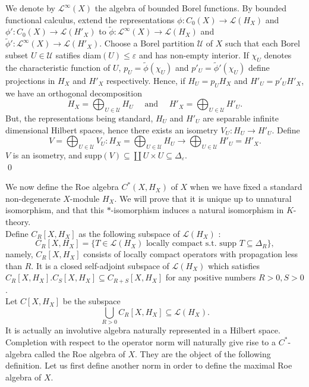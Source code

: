\begin{dem}
We denote by $\mathcal L^\infty(X)$ the algebra of bounded Borel functions. By bounded functional calculus, extend the representations $\phi : C_0(X)\rightarrow \mathcal L(H_X)$ and $\phi' : C_0(X)\rightarrow \mathcal L(H'_X)$ to $\tilde \phi : \mathcal L^\infty(X)\rightarrow \mathcal L(H_X) $ and $\tilde \phi' : \mathcal L^\infty(X)\rightarrow \mathcal L(H'_X) $. Choose a Borel partition $\mathcal U$ of $X$ such that each Borel subset $U\in\mathcal U$ satifies diam$(U)\leq \varepsilon $ and has non-empty interior. If $\chi_U$ denotes the characteristic function of $U$, $p_U = \tilde\phi(\chi_U)$ and $p'_{U}=\tilde\phi'(\chi_U)$ define projections in $H_X$ and $H'_X$ respectively. Hence, if $H_U = p_U H_X$ and $H'_U= p'_U H'_X$, we have an orthogonal decomposition 
\[H_X = \bigoplus_{U\in\mathcal U} H_U \quad  \text{ and } \quad H'_X = \bigoplus_{U\in\mathcal U} H'_U.\]
But, the representations being standard, $H_U$ and $H'_U$ are separable infinite dimensional Hilbert spaces, hence there exists an isometry $V_U : H_U\rightarrow H'_U$. Define 
\[V = \bigoplus_{U\in\mathcal U} V_U : H_X = \bigoplus_{U\in\mathcal U} H_U \rightarrow  \bigoplus_{U\in\mathcal U} H'_U = H'_X.  \]
$V$ is an isometry, and supp$(V)\subseteq \coprod U\times U \subseteq \Delta_\varepsilon$.\\
\qed
\end{dem}


We now define the Roe algebra $C^*(X, H_X)$ of $X$ when we have fixed a standard non-degenerate $X$-module $H_X$. We will prove that it is unique up to unnatural isomorphism, and that this $*$-isomorphism induces a natural isomorphism in $K$-theory.\\

Define $C_R[X,H_X]$ as the following subspace of $\mathcal L(H_X)$ :
\[C_R[X,H_X] = \{T\in \mathcal L(H_X) \text{ locally compact  s.t. supp }T\subseteq \Delta_R \},\]
namely, $C_R[X,H_X]$ consists of locally compact operators with propagation less than $R$. It is a closed self-adjoint subspace of $\mathcal L(H_X)$ which satisfies $C_R[X,H_X].C_S[X,H_X]\subseteq C_{R+S}[X,H_X]$ for any positive numbers $R>0,S>0$.\\

Let $C[X,H_X]$ be the subspace 
\[\bigcup_{R>0} C_R[X,H_X]\subseteq \mathcal L(H_X).\] 
It is actually an involutive algebra naturally represented in a Hilbert space. Completion with respect to the operator norm will naturally give rise to a $C^*$-algebra called the Roe algebra of $X$. They are the object of the following definition. Let us first define another norm in order to define the maximal Roe algebra of $X$.\\

